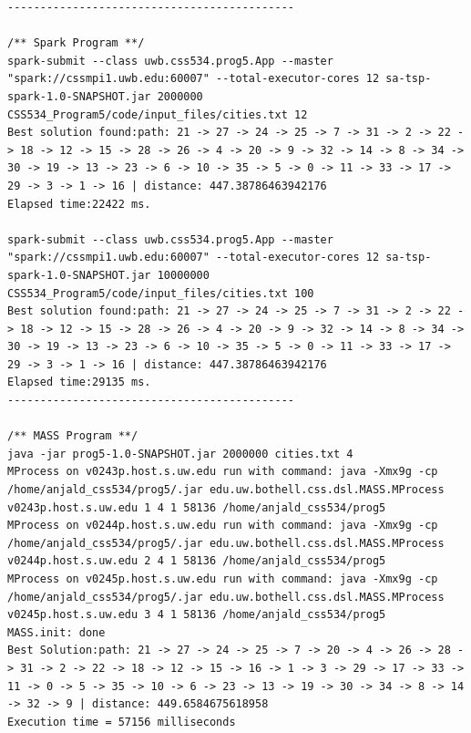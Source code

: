 \documentclass{article}
\begin{document}
\begin{lstlisting}
--------------------------------------------

/** Spark Program **/
spark-submit --class uwb.css534.prog5.App --master "spark://cssmpi1.uwb.edu:60007" --total-executor-cores 12 sa-tsp-spark-1.0-SNAPSHOT.jar 2000000 CSS534_Program5/code/input_files/cities.txt 12
Best solution found:path: 21 -> 27 -> 24 -> 25 -> 7 -> 31 -> 2 -> 22 -> 18 -> 12 -> 15 -> 28 -> 26 -> 4 -> 20 -> 9 -> 32 -> 14 -> 8 -> 34 -> 30 -> 19 -> 13 -> 23 -> 6 -> 10 -> 35 -> 5 -> 0 -> 11 -> 33 -> 17 -> 29 -> 3 -> 1 -> 16 | distance: 447.38786463942176
Elapsed time:22422 ms.

spark-submit --class uwb.css534.prog5.App --master "spark://cssmpi1.uwb.edu:60007" --total-executor-cores 12 sa-tsp-spark-1.0-SNAPSHOT.jar 10000000 CSS534_Program5/code/input_files/cities.txt 100
Best solution found:path: 21 -> 27 -> 24 -> 25 -> 7 -> 31 -> 2 -> 22 -> 18 -> 12 -> 15 -> 28 -> 26 -> 4 -> 20 -> 9 -> 32 -> 14 -> 8 -> 34 -> 30 -> 19 -> 13 -> 23 -> 6 -> 10 -> 35 -> 5 -> 0 -> 11 -> 33 -> 17 -> 29 -> 3 -> 1 -> 16 | distance: 447.38786463942176
Elapsed time:29135 ms.
--------------------------------------------

/** MASS Program **/
java -jar prog5-1.0-SNAPSHOT.jar 2000000 cities.txt 4
MProcess on v0243p.host.s.uw.edu run with command: java -Xmx9g -cp /home/anjald_css534/prog5/.jar edu.uw.bothell.css.dsl.MASS.MProcess v0243p.host.s.uw.edu 1 4 1 58136 /home/anjald_css534/prog5
MProcess on v0244p.host.s.uw.edu run with command: java -Xmx9g -cp /home/anjald_css534/prog5/.jar edu.uw.bothell.css.dsl.MASS.MProcess v0244p.host.s.uw.edu 2 4 1 58136 /home/anjald_css534/prog5
MProcess on v0245p.host.s.uw.edu run with command: java -Xmx9g -cp /home/anjald_css534/prog5/.jar edu.uw.bothell.css.dsl.MASS.MProcess v0245p.host.s.uw.edu 3 4 1 58136 /home/anjald_css534/prog5
MASS.init: done
Best Solution:path: 21 -> 27 -> 24 -> 25 -> 7 -> 20 -> 4 -> 26 -> 28 -> 31 -> 2 -> 22 -> 18 -> 12 -> 15 -> 16 -> 1 -> 3 -> 29 -> 17 -> 33 -> 11 -> 0 -> 5 -> 35 -> 10 -> 6 -> 23 -> 13 -> 19 -> 30 -> 34 -> 8 -> 14 -> 32 -> 9 | distance: 449.6584675618958
Execution time = 57156 milliseconds


			\end{lstlisting}	
	
\end{document}
